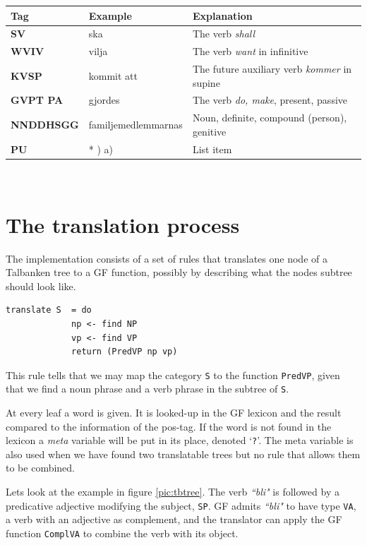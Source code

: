\documentclass{report}
\begin{document}
\begin{tabular}{lll}
\textbf{Tag} & \textbf{Example} & \textbf{Explanation} \\
\hline
\textbf{SV} & ska & The verb \emph{shall}\\
\textbf{WVIV} & vilja & The verb \emph{want} in infinitive\\
\textbf{KVSP} & kommit att & The future auxiliary verb \emph{kommer} in supine\\
\textbf{GVPT  PA} & gjordes & The verb \emph{do, make}, present, passive \\
\textbf{NNDDHSGG} & familjemedlemmarnas & Noun, definite, compound (person), genitive \\
\textbf{PU} & * \; 1) \; a) & List item\\
\end{tabular}\\


\section{The translation process}
The implementation consists of a set of rules that translates
one node of a Talbanken tree to a GF function, possibly by describing what the
nodes subtree should look like. 
\begin{verbatim}
translate S  = do
             np <- find NP
             vp <- find VP
             return (PredVP np vp)
\end{verbatim}
This rule tells that we may map the category \verb-S- to the function 
\verb-PredVP-, given that we find a noun phrase and a verb phrase in
the subtree of \verb-S-.

At every leaf a word is given. %
It is looked-up in the GF lexicon and the result compared to the information of
the pos-tag.
If the word is not found in the lexicon
a \textit{meta} variable will be put in its place, denoted `\verb-?-'.
The meta variable is also used when we have found two translatable trees
but no rule that allows them to be combined.

Lets look at the example in figure
\ref{pic:tbtree}. The verb \emph{``bli"} is
followed by a predicative 
adjective modifying the subject, \verb|SP|. GF admits \emph{``bli"} to have
type \verb|VA|, a verb with an adjective as complement, and the translator can
apply the GF function \verb|ComplVA| to combine the verb with its object. \\
\end{document}
